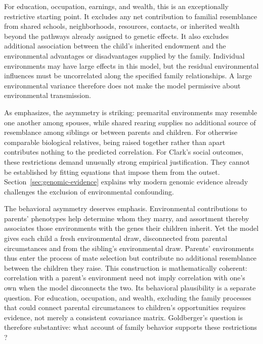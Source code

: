 For education, occupation, earnings, and wealth, this is an exceptionally
restrictive starting point. It excludes any net contribution to familial
resemblance from shared schools, neighborhoods, resources, contacts, or
inherited wealth beyond the pathways already assigned to genetic effects.
It also excludes additional association between the child's inherited
endowment and the environmental advantages or disadvantages supplied by
the family. Individual environments may have large effects in this model,
but the residual environmental influences must be uncorrelated along the
specified family relationships. A large environmental variance therefore
does not make the model permissive about environmental transmission.

As \citet[pp.~10--11]{Goldberger1978} emphasizes, the asymmetry is striking:
premarital environments may resemble one another among spouses, while
shared rearing supplies no additional source of resemblance among
siblings or between parents and children. For otherwise comparable
biological relatives, being raised together rather than apart contributes
nothing to the predicted correlation. For Clark's social outcomes, these
restrictions demand unusually strong empirical justification. They cannot
be established by fitting equations that impose them from the outset.
Section~\ref{sec:genomic-evidence} explains why modern genomic evidence
already challenges the exclusion of environmental confounding.

The behavioral asymmetry deserves emphasis. Environmental contributions
to parents' phenotypes help determine whom they marry, and assortment
thereby associates those environments with the genes their children
inherit. Yet the model gives each child a fresh environmental draw,
disconnected from parental circumstances and from the sibling's
environmental draw. Parents' environments thus enter the process of mate
selection but contribute no additional resemblance between the children
they raise. This construction is mathematically coherent: correlation with
a parent's environment need not imply correlation with one's own when
the model disconnects the two. Its behavioral plausibility is a separate
question. For education, occupation, and wealth, excluding the family
processes that could connect parental circumstances to children's
opportunities requires evidence, not merely a consistent covariance matrix.
Goldberger's question is therefore substantive: what account of family
behavior supports these restrictions \citep[pp.~36--37]{Goldberger1978}?


